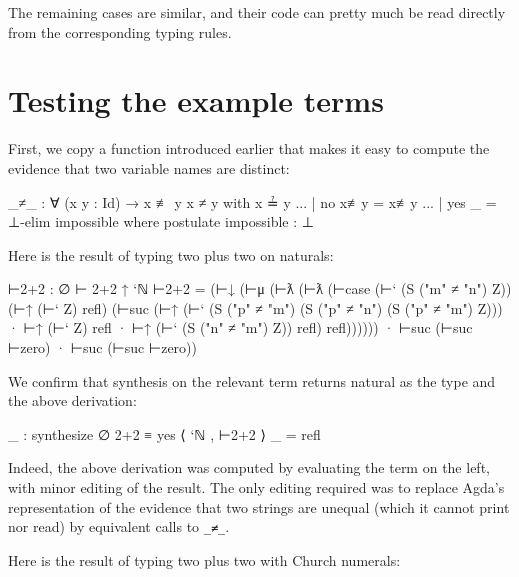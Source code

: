 The remaining cases are similar, and their code can pretty much be read
directly from the corresponding typing rules.

\hypertarget{testing-the-example-terms}{%
\section{Testing the example terms}\label{testing-the-example-terms}}

First, we copy a function introduced earlier that makes it easy to
compute the evidence that two variable names are distinct:

\begin{fence}
\begin{code}
_≠_ : ∀ (x y : Id) → x ≢ y
x ≠ y  with x ≟ y
...       | no  x≢y  =  x≢y
...       | yes _    =  ⊥-elim impossible
  where postulate impossible : ⊥
\end{code}
\end{fence}

Here is the result of typing two plus two on naturals:

\begin{fence}
\begin{code}
⊢2+2 : ∅ ⊢ 2+2 ↑ `ℕ
⊢2+2 =
  (⊢↓
   (⊢μ
    (⊢ƛ
     (⊢ƛ
      (⊢case (⊢` (S ("m" ≠ "n") Z)) (⊢↑ (⊢` Z) refl)
       (⊢suc
        (⊢↑
         (⊢`
          (S ("p" ≠ "m")
           (S ("p" ≠ "n")
            (S ("p" ≠ "m") Z)))
          · ⊢↑ (⊢` Z) refl
          · ⊢↑ (⊢` (S ("n" ≠ "m") Z)) refl)
         refl))))))
   · ⊢suc (⊢suc ⊢zero)
   · ⊢suc (⊢suc ⊢zero))
\end{code}
\end{fence}

We confirm that synthesis on the relevant term returns natural as the
type and the above derivation:

\begin{fence}
\begin{code}
_ : synthesize ∅ 2+2 ≡ yes ⟨ `ℕ , ⊢2+2 ⟩
_ = refl
\end{code}
\end{fence}

Indeed, the above derivation was computed by evaluating the term on the
left, with minor editing of the result. The only editing required was to
replace Agda's representation of the evidence that two strings are
unequal (which it cannot print nor read) by equivalent calls to
\texttt{\_≠\_}.

Here is the result of typing two plus two with Church numerals:

